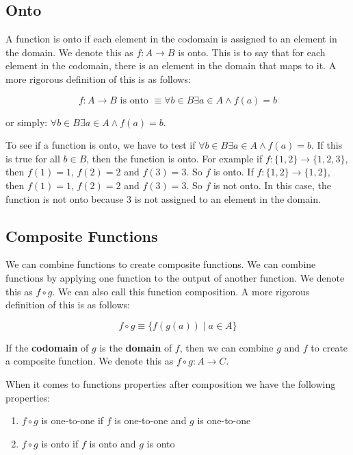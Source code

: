 \documentclass[11pt]{article}
\begin{document}
\subsection{Onto}
\label{sec:orgb70e140}
A function is onto if each element in the codomain is assigned to an element in the domain. We denote this as \(f: A \rightarrow B\) is onto. This is to say that for each element in the codomain, there is an element in the domain that maps to it. A more rigorous definition of this is as follows:

\[
f: A \rightarrow B \text{ is onto } \equiv \forall b \in B \exists a \in A \land f(a) = b
\]

or simply: \(\forall b \in B \exists a \in A \land f(a) = b\).

To see if a function is onto, we have to test if \(\forall b \in B \exists a \in A \land f(a) = b\). If this is true for all \(b \in B\), then the function is onto. For example if \(f: \{1,2\} \rightarrow \{1,2,3\}\), then \(f(1) = 1\), \(f(2) = 2\) and \(f(3) = 3\). So \(f\) is onto. If \(f: \{1,2\} \rightarrow \{1,2\}\), then \(f(1) = 1\), \(f(2) = 2\) and \(f(3) = 3\). So \(f\) is not onto. In this case, the function is not onto because \(3\) is not assigned to an element in the domain.

\subsection{Composite Functions}
\label{sec:org1c1e13f}
We can combine functions to create composite functions. We can combine functions by applying one function to the output of another function. We denote this as \(f \circ g\). We can also call this function composition. A more rigorous definition of this is as follows:

\[
f \circ g \equiv \{f(g(a)) \mid a \in A\}
\]

If the \textbf{codomain} of \(g\) is the \textbf{domain} of \(f\), then we can combine \(g\) and \(f\) to create a composite function. We denote this as \(f \circ g: A \rightarrow C\).

When it comes to functions properties after composition we have the following properties:
\begin{enumerate}
\item \(f \circ g\) is one-to-one if \(f\) is one-to-one and \(g\) is one-to-one
\item \(f \circ g\) is onto if \(f\) is onto and \(g\) is onto
\end{enumerate}
\end{document}
